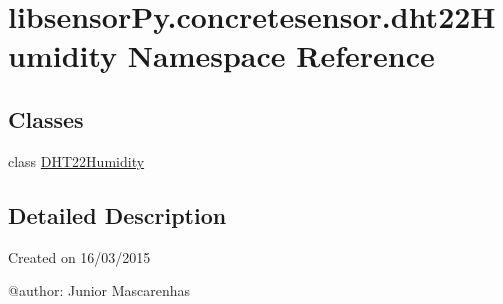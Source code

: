 \hypertarget{namespacelibsensorPy_1_1concretesensor_1_1dht22Humidity}{}\section{libsensor\+Py.\+concretesensor.\+dht22\+Humidity Namespace Reference}
\label{namespacelibsensorPy_1_1concretesensor_1_1dht22Humidity}
\subsection*{Classes}
\begin{DoxyCompactItemize}
\item 
class \hyperlink{classlibsensorPy_1_1concretesensor_1_1dht22Humidity_1_1DHT22Humidity}{D\+H\+T22\+Humidity}
\end{DoxyCompactItemize}


\subsection{Detailed Description}
\begin{DoxyVerb}Created on 16/03/2015

@author: Junior Mascarenhas
\end{DoxyVerb}
 